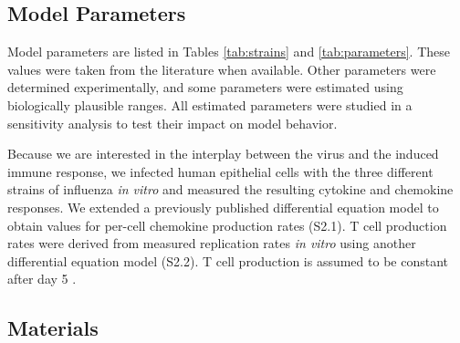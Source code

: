 \documentclass[10pt]{article}
\begin{document}
\subsection*{Model Parameters}

Model parameters are listed in Tables \ref{tab:strains} and \ref{tab:parameters}. These values were taken from the literature when available.  Other parameters were determined experimentally, and some parameters were estimated using biologically plausible ranges.  All estimated parameters were studied in a sensitivity analysis to test their impact on model behavior. 

Because we are interested in the interplay between the virus and the induced immune response, we infected human epithelial cells with the three different strains of influenza \textit{in vitro} and measured the resulting cytokine and chemokine responses.  We extended a previously published differential equation model \cite{Mitchell2011} to obtain values for per-cell chemokine production rates (S2.1).  T cell production rates were derived from measured replication rates \textit{in vitro} \cite{Miao2010} using another differential equation model (S2.2). T cell production is assumed to be constant after day 5 \cite{MartIn-Fontecha2003}.  

\subsection*{Materials}
\end{document}
